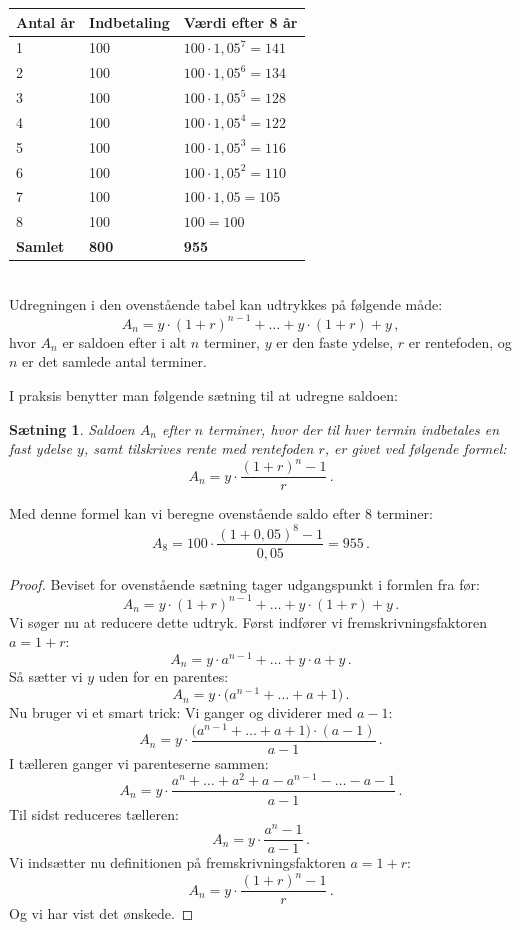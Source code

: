 \documentclass[12pt,oneside,a4paper]{article}
\newtheorem{thm}{Sætning}[section]
\begin{document}
\begin{tabular}{|l|l|l|}
    \hline
    \textbf{Antal år} & \textbf{Indbetaling} & \textbf{Værdi efter 8 år} \\
    \hline
    1 & 100 & $100 \cdot 1,05^7 = 141$ \\
    \hline
    2 & 100 & $100 \cdot 1,05^6 = 134$ \\
    \hline
    3 & 100 & $100 \cdot 1,05^5 = 128$ \\
    \hline
    4 & 100 & $100 \cdot 1,05^4 = 122$ \\
    \hline
    5 & 100 & $100 \cdot 1,05^3 = 116$ \\
    \hline
    6 & 100 & $100 \cdot 1,05^2 = 110$ \\
    \hline
    7 & 100 & $100 \cdot 1,05 = 105$ \\
    \hline
    8 & 100 & $100 = 100$ \\
    \hline
    \textbf{Samlet} & \textbf{800} & \textbf{955} \\
    \hline
\end{tabular}
\\

Udregningen i den ovenstående tabel kan udtrykkes på følgende måde:
\[
A_n = y\cdot(1+r)^{n-1} + \ldots + y\cdot(1+r) + y \,,
\]
hvor $A_n$ er saldoen efter i alt $n$ terminer,  $y$ er den faste
ydelse, $r$ er rentefoden, og $n$ er det samlede antal terminer.

I praksis benytter man følgende sætning til at udregne saldoen:
\begin{tcolorbox}
\begin{thm}
Saldoen $A_n$ efter $n$ terminer, hvor der til hver termin indbetales en fast ydelse $y$,
samt tilskrives rente med rentefoden $r$, er givet ved følgende formel:
\[
A_n = y\cdot\frac{(1+r)^n-1}{r}\,.
\]
\end{thm}
\end{tcolorbox}

Med denne formel kan vi beregne ovenstående saldo efter 8 terminer:
\[
A_8 = 100\cdot\frac{(1+0,05)^8-1}{0,05} = 955 \,.
\]

\begin{tcolorbox}
\begin{proof}
Beviset for ovenstående sætning tager udgangspunkt i formlen fra før:
\[
A_n = y\cdot(1+r)^{n-1} + \ldots + y\cdot(1+r) + y \,.
\]
Vi søger nu at reducere dette udtryk. Først indfører vi fremskrivningsfaktoren $a=1+r$:
\[
A_n = y\cdot a^{n-1} + \ldots + y\cdot a + y \,.
\]
Så sætter vi $y$ uden for en parentes:
\[
A_n = y\cdot\big(a^{n-1} + \ldots + a + 1\big) \,.
\]
Nu bruger vi et smart trick: Vi ganger og dividerer med $a-1$:
\[
A_n = y\cdot\frac{\big(a^{n-1} + \ldots + a + 1\big)\cdot(a-1)}{a-1} \,.
\]
I tælleren ganger vi parenteserne sammen:
\[
A_n = y\cdot\frac{a^{n} + \ldots + a^2 + a - a^{n-1} - \ldots - a - 1}{a-1} \,.
\]
Til sidst reduceres tælleren:
\[
A_n = y\cdot\frac{a^{n} - 1}{a-1} \,.
\]
Vi indsætter nu definitionen på fremskrivningsfaktoren $a=1+r$:
\[
A_n = y\cdot\frac{(1+r)^{n} - 1}{r} \,.
\]
Og vi har vist det ønskede.
\end{proof}
\end{tcolorbox}
\end{document}
